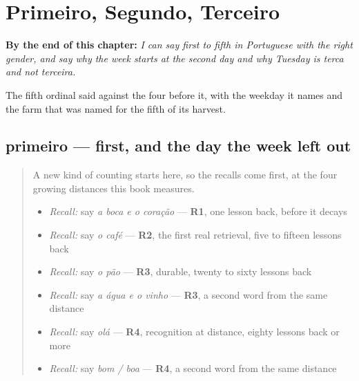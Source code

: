 
\chapter{Primeiro, Segundo, Terceiro}
\label{ch:pt-ordinais}

\begin{chapteropening}
\textbf{By the end of this chapter:} \emph{I can say first to fifth in Portuguese with the right gender, and say why the week starts at the second day and why Tuesday is terca and not terceira.}

The fifth ordinal said against the four before it, with the weekday it names and the farm that was named for the fifth of its harvest.
\end{chapteropening}

\section[primeiro / primeira]{primeiro — first, and the day the week left out}

\label{lesson:PT-C27-primeiro}



\begin{quote}
A new kind of counting starts here, so the recalls come first, at the four growing distances this book measures.

\begin{itemize}
\raggedright
  \item \emph{Recall:} say \emph{a boca e o coração} — \textbf{R1}, one lesson back, before it decays
  \item \emph{Recall:} say \emph{o café} — \textbf{R2}, the first real retrieval, five to fifteen lessons back
  \item \emph{Recall:} say \emph{o pão} — \textbf{R3}, durable, twenty to sixty lessons back
  \item \emph{Recall:} say \emph{a água e o vinho} — \textbf{R3}, a second word from the same distance
  \item \emph{Recall:} say \emph{olá} — \textbf{R4}, recognition at distance, eighty lessons back or more
  \item \emph{Recall:} say \emph{bom / boa} — \textbf{R4}, a second word from the same distance
\end{itemize}
\end{quote}

